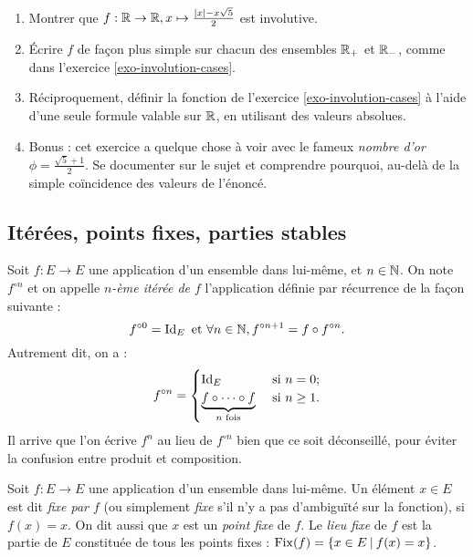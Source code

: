 \begin{exercice}\label{exo-involution-abs}
\begin{enumerate}
\item Montrer que $f : \mathbb{R}\to \mathbb{R}, x\mapsto \frac{|x|-x\sqrt 5}{2}$ est involutive.
\item Écrire $f$ de façon plus simple sur chacun des ensembles $\mathbb{R}_+$ et $\mathbb{R}_-$, comme dans l'exercice \ref{exo-involution-cases}.
\item Réciproquement, définir la fonction de l'exercice \ref{exo-involution-cases} à l'aide d'une seule formule valable sur $\mathbb{R}$, en utilisant des valeurs absolues.
\item Bonus : cet exercice a quelque chose à voir avec le fameux \emph{nombre d'or} $\phi = \frac{\sqrt 5 +1}{2}$. Se documenter sur le sujet et comprendre pourquoi, au-delà de la simple coïncidence des valeurs de l'énoncé.
\end{enumerate}
\end{exercice}



\subsection{Itérées, points fixes, parties stables}

\begin{definition}
Soit $f : E\to E$ une application d'un ensemble dans lui-même, et $n\in \mathbb{N}$. On  note $f^{\circ n}$ et on appelle \emph{$n$-ème itérée de $f$}  l'application définie par récurrence de la façon suivante :
\[ f^{\circ 0} = \operatorname{Id}_E \text{ et } \forall n\in \mathbb{N}, f^{\circ n+1} = f\circ f^{\circ n}.\]
Autrement dit, on a :
\[ 
f^{\circ n} = \begin{cases}
\operatorname{Id}_E & \text{ si } n=0;\\
\underbrace{f\circ \dots \circ f}_{n \text{ fois}} & \text{ si } n\geq 1.
\end{cases}
\]
Il arrive que l'on écrive $f^n$ au lieu de $f^{\circ n}$ bien que ce soit déconseillé, pour éviter la confusion entre produit et composition.
\end{definition}

\begin{definition}\label{def-point-fixe}
Soit $f : E\to E$ une application d'un ensemble dans lui-même. Un élément $x\in E$ est dit \emph{fixe par $f$} (ou simplement \emph{fixe} s'il n'y a pas d'ambiguïté sur la fonction), si $f(x)=x$. On dit aussi que $x$ est un \emph{point fixe} de $f$. Le \emph{lieu fixe} de $f$ est la partie de $E$ constituée de tous les points fixes : $\operatorname{Fix}(f) = \{x\in E\:|\: f(x)=x \}$.
\end{definition}

